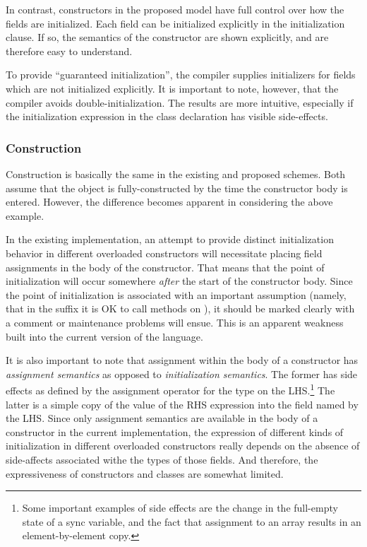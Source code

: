 In contrast, constructors in the proposed model have full control over how the
fields are initialized.  Each field can be initialized explicitly in the
initialization clause.  If so, the semantics of the constructor are shown
explicitly, and are therefore easy to understand.

To provide ``guaranteed initialization'', the compiler supplies initializers for
fields which are not initialized explicitly.  It is important to note, however,
that the compiler avoids double-initialization.  The results are more intuitive,
especially if the initialization expression in the class declaration has visible
side-effects.

\subsubsection{Construction}
Construction is basically the same in the existing and proposed schemes.
Both assume that the object is fully-constructed by the time the constructor
body is entered.  However, the difference becomes apparent in considering the
above example.

In the existing implementation, an attempt to provide distinct
initialization behavior in different overloaded constructors will necessitate placing
field assignments in the body of the constructor.  That means that the point of
initialization will occur somewhere \emph{after} the start of the constructor
body.  Since the point of initialization is associated with an important
assumption (namely, that in the suffix it is OK to call methods on ),
it should be marked clearly with a comment or maintenance problems will ensue.
This is an apparent weakness built into the current version of the language.

It is also important to note that assignment within the body of a constructor
has \emph{assignment semantics} as opposed to \emph{initialization semantics}.
The former has side effects as defined by the assignment operator for the type
on the LHS.\footnote{Some important examples of side effects are the change in the
full-empty state of a sync variable, and the fact that assignment to an array
results in an element-by-element copy.}  The latter is a simple copy of the
value of the RHS expression into the field named by the LHS.  Since only
assignment semantics are available in the body of a constructor in the current
implementation, the expression of different kinds of initialization in different
overloaded constructors really depends on the absence of side-affects associated
withe the types of those fields.  And therefore, the expressiveness of
constructors and classes are somewhat limited.

